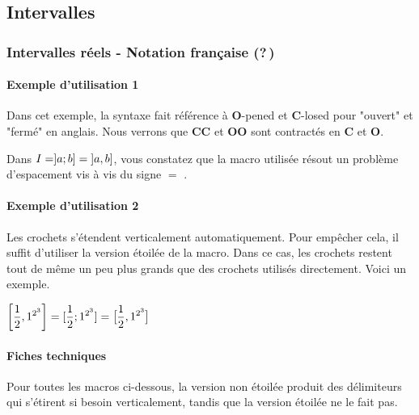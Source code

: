 \documentclass[12pt,a4paper]{article}
\begin{document}

\subsection{Intervalles}

\subsubsection{Intervalles réels - Notation française (?\,)}

\paragraph{Exemple d'utilisation 1}

Dans cet exemple, la syntaxe fait référence à \textbf{O}-pened et \textbf{C}-losed pour "ouvert" et "fermé" en anglais.
Nous verrons que \textbf{CC} et \textbf{OO} sont contractés en \textbf{C} et \textbf{O}.

\begin{tcblisting}{}
Dans $I = ]a ; b] = \intervalOC{a}{b}$, vous constatez que la macro utilisée résout
un problème d'espacement vis à vis du signe $=$ .
\end{tcblisting}


\paragraph{Exemple d'utilisation 2}

Les crochets s'étendent verticalement automatiquement. Pour empêcher cela, il suffit d'utiliser la version étoilée de la macro.
Dans ce cas, les crochets restent tout de même un peu plus grands que des crochets utilisés directement. Voici un exemple.

\begin{tcblisting}{}
$\displaystyle \intervalC{ \frac{1}{2} }{ 1^{2^{3}} }
             = [ \frac{1}{2} ; 1^{2^{3}} ]
             = \intervalC*{ \frac{1}{2} }{ 1^{2^{3}} }$
\end{tcblisting}


\paragraph{Fiches techniques}

Pour toutes les macros ci-dessous, la version non étoilée produit des délimiteurs qui s'étirent si besoin verticalement, tandis que la version étoilée ne le fait pas.
\end{document}
